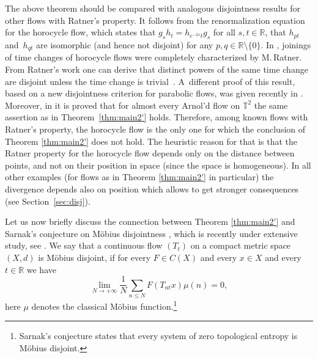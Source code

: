 \documentclass[JEP,XML,SOM,Unicode,NoEqCountersInSection]{cedram}
\theoremstyle{definition}
\theoremstyle{plain}
\newcommand\RR{\mathbb{R}}
\newcommand\TT{\mathbb{T}}
\begin{document}
The above theorem should be compared with analogous disjointness results for other flows with Ratner's property. It follows from the renormalization equation for the horocycle flow, which states that $g_sh_t=h_{e^{-2s}t}g_s$ for all $s,t\in \RR$, that $h_{pt}$ and~$h_{qt}$ are isomorphic (and hence not disjoint) for any $p,q\in \RR\setminus\{0\}$. In \cite{Rat2}, joinings of time changes of horocycle flows were completely characterized by
M.\,Ratner. From Ratner's work one can derive that distinct powers of the same time change are disjoint unless the time change is trivial~\cite{FlaFo2}. A~different proof of this result, based on a new disjointness criterion for parabolic flows, was given recently in \cite{KLU}. Moreover, in \cite{KLU} it is proved that for almost every Arnol'd flow on $\TT^2$ the same assertion as in Theorem~\ref{thm:main2'} holds. Therefore, among known flows with Ratner's property, the horocycle flow is the only one for which the conclusion of Theorem \ref{thm:main2'} does not hold. The heuristic reason for that is that the Ratner property for the horocycle flow depends only on the distance between points, and not on their position in space (since the space is homogeneous). In all other examples (for flows as in Theorem \ref{thm:main2'} in particular) the divergence depends also on position which allows to get stronger consequences (see Section~\ref{sec:disj}).

Let us now briefly discuss the connection between Theorem \ref{thm:main2'} and Sarnak's conjecture on Möbius disjointness \cite{Sar}, which is recently under extensive study, see \eg \cite{FKL}. We say that a continuous flow $(T_t)$ on a compact metric space $(X,d)$ is Möbius disjoint, if for every $F\in C(X)$ and every $x\in X$ and every $t\in \RR$ we have\enlargethispage{2pt}%
\begin{equation}\label{M}
\lim_{N\to+\infty}\frac{1}{N}\sum_{n\leq N}F(T_{nt}x)\mu(n)=0,
\end{equation}
here $\mu$ denotes the classical Möbius function.\footnote{Sarnak's conjecture states that every system of zero topological entropy is Möbius disjoint.}
\end{document}
